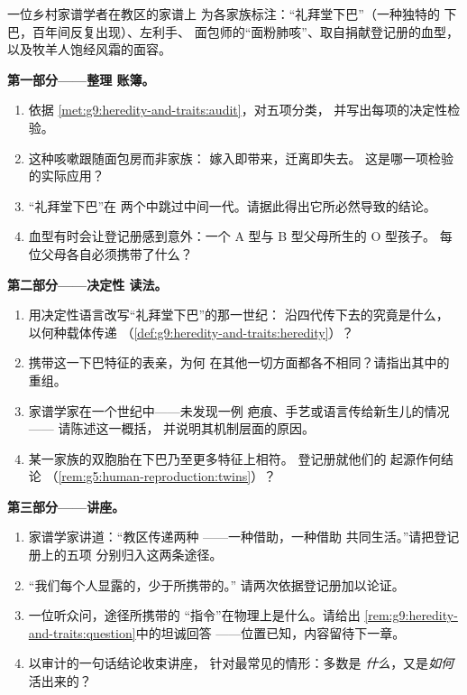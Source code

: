 \begin{problem}\label{pb:g9:heredity-and-traits:1}
一位乡村家谱学者在教区的家谱上
为各家族标注：“礼拜堂下巴”（一种独特的
下巴，百年间反复出现）、左利手、
面包师的“面粉肺咳”、取自捐献登记册的血型，
以及牧羊人饱经风霜的面容。

\medskip\noindent\textbf{第一部分——整理
账簿。}
\begin{enumerate}
  \item 依据
        \cref{met:g9:heredity-and-traits:audit}，对五项分类，
        并写出每项的决定性检验。
  \item 这种咳嗽跟随面包房而非家族：
        嫁入即带来，迁离即失去。
        这是哪一项检验的实际应用？
  \item “礼拜堂下巴”在
        两个中跳过中间一代。请据此得出它所必然导致的结论。
  \item 血型有时会让登记册感到意外：一个
        A 型与 B 型父母所生的 O 型孩子。
        每位父母各自必须携带了什么？
\end{enumerate}

\medskip\noindent\textbf{第二部分——决定性
读法。}
\begin{enumerate}[resume]
  \item 用决定性语言改写“礼拜堂下巴”的那一世纪：
        沿四代传下去的究竟是什么，
        以何种载体传递
        （\cref{def:g9:heredity-and-traits:heredity}）？
  \item 携带这一下巴特征的表亲，为何
        在其他一切方面都各不相同？请指出其中的重组。
  \item 家谱学家在一个世纪中——未发现一例
        疤痕、手艺或语言传给新生儿的情况——
        请陈述这一概括，
        并说明其机制层面的原因。
  \item 某一家族的双胞胎在下巴乃至更多特征上相符。
        登记册就他们的
        起源作何结论
        （\cref{rem:g5:human-reproduction:twins}）？
\end{enumerate}

\medskip\noindent\textbf{第三部分——讲座。}
\begin{enumerate}[resume]
  \item 家谱学家讲道：“教区传递两种
        ——一种借助，一种借助
        共同生活。”请把登记册上的五项
        分别归入这两条途径。
  \item “我们每个人显露的，少于所携带的。”
        请两次依据登记册加以论证。
  \item 一位听众问，途径所携带的
        “指令”在物理上是什么。请给出
        \cref{rem:g9:heredity-and-traits:question}中的坦诚回答
        ——位置已知，内容留待下一章。
  \item 以审计的一句话结论收束讲座，
        针对最常见的情形：多数是
        \emph{什么}，又是\emph{如何}活出来的？
\end{enumerate}
\end{problem}
